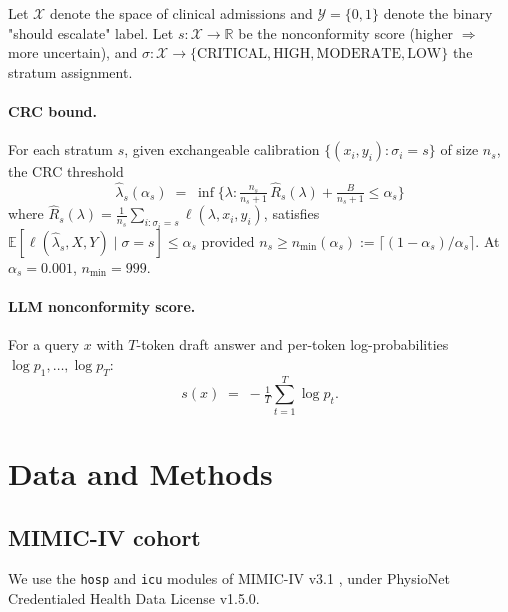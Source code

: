 \documentclass[11pt,letterpaper]{article}
\newcommand{\Ex}{\mathbb{E}}
\begin{document}
Let $\mathcal{X}$ denote the space of clinical admissions and $\mathcal{Y} =
\{0, 1\}$ denote the binary "should escalate" label. Let $s : \mathcal{X}
\to \mathbb{R}$ be the nonconformity score (higher $\Rightarrow$ more
uncertain), and $\sigma : \mathcal{X} \to \{\text{CRITICAL}, \text{HIGH},
\text{MODERATE}, \text{LOW}\}$ the stratum assignment.

\paragraph{CRC bound.} For each stratum $s$, given exchangeable calibration
$\{(x_i, y_i) : \sigma_i = s\}$ of size $n_s$, the CRC threshold
\[
\hat{\lambda}_s(\alpha_s) \;=\; \inf\Big\{ \lambda :
\tfrac{n_s}{n_s+1}\,\hat{R}_s(\lambda) + \tfrac{B}{n_s+1} \le \alpha_s \Big\}
\]
where $\hat{R}_s(\lambda) = \frac{1}{n_s}\sum_{i:\sigma_i = s} \ell(\lambda,
x_i, y_i)$, satisfies $\Ex[\ell(\hat{\lambda}_s, X, Y) \mid \sigma = s] \le
\alpha_s$ provided $n_s \ge n_{\min}(\alpha_s) := \lceil (1 - \alpha_s) /
\alpha_s \rceil$. At $\alpha_s = 0.001$, $n_{\min} = 999$.

\paragraph{LLM nonconformity score.} For a query $x$ with $T$-token draft
answer and per-token log-probabilities $\log p_1, \ldots, \log p_T$:
\[
s(x) \;=\; -\tfrac{1}{T} \sum_{t=1}^T \log p_t.
\]

\section{Data and Methods}

\subsection{MIMIC-IV cohort}
We use the \texttt{hosp} and \texttt{icu} modules of MIMIC-IV v3.1
\cite{MIMICIVv31}, under PhysioNet Credentialed Health Data License v1.5.0.
\end{document}
